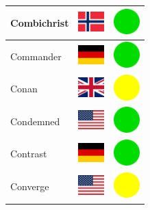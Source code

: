 \documentclass[12pt, a4paper, twoside]{report}
\begin{document}
\begin{center}
\begin{longtable}{|p{5cm}|p{2cm}|p{2cm}|}
 Combichrist                                                & \includegraphics[width=1cm]{../img/flags/no} &   \includegraphics[width=1cm]{../likes/y} \\ \hline
 Commander                                                  & \includegraphics[width=1cm]{../img/flags/de} &   \includegraphics[width=1cm]{../likes/y} \\ \hline
 Conan                                                      & \includegraphics[width=1cm]{../img/flags/gb} &   \includegraphics[width=1cm]{../likes/m} \\ \hline
 Condemned                                                  & \includegraphics[width=1cm]{../img/flags/us} &   \includegraphics[width=1cm]{../likes/y} \\ \hline
 Contrast                                                   & \includegraphics[width=1cm]{../img/flags/de} &   \includegraphics[width=1cm]{../likes/y} \\ \hline
 Converge                                                   & \includegraphics[width=1cm]{../img/flags/us} &   \includegraphics[width=1cm]{../likes/m} \\ \hline

\end{longtable}
\end{center}
\end{document}
